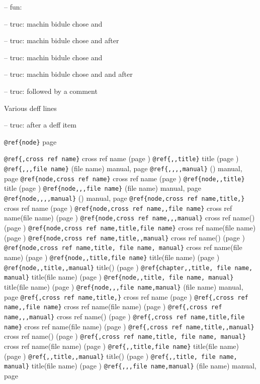 \documentclass{book}
\begin{document}
\hbox{}-- fun: 


\hbox{}-- truc: machin bidule chose and


\hbox{}-- truc: machin bidule chose and  after


\hbox{}-- truc: machin bidule chose and 


\hbox{}-- truc: machin bidule chose and and after


\hbox{}-- truc: followed by a comment


Various deff lines


\hbox{}-- truc: after a deff item


\texttt{@ref\{node\}} page \pageref{anchor:node}


\texttt{@ref\{,cross ref name\}} cross ref name (page \pageref{anchor:})
\texttt{@ref\{,,title\}} title (page \pageref{anchor:})
\texttt{@ref\{,,,file name\}} (file name) manual, page \pageref{anchor:}
\texttt{@ref\{,,,,manual\}} () manual, page \pageref{anchor:}
\texttt{@ref\{node,cross ref name\}} cross ref name (page \pageref{anchor:node})
\texttt{@ref\{node,,title\}} title (page \pageref{anchor:node})
\texttt{@ref\{node,,,file name\}} (file name) manual, page \pageref{anchor:node}
\texttt{@ref\{node,,,,manual\}} () manual, page \pageref{anchor:node}
\texttt{@ref\{node,cross ref name,title,\}} cross ref name (page \pageref{anchor:node})
\texttt{@ref\{node,cross ref name,,file name\}} cross ref name(file name) (page \pageref{anchor:node})
\texttt{@ref\{node,cross ref name,,,manual\}} cross ref name() (page \pageref{anchor:node})
\texttt{@ref\{node,cross ref name,title,file name\}} cross ref name(file name) (page \pageref{anchor:node})
\texttt{@ref\{node,cross ref name,title,,manual\}} cross ref name() (page \pageref{anchor:node})
\texttt{@ref\{node,cross ref name,title, file name, manual\}} cross ref name(file name) (page \pageref{anchor:node})
\texttt{@ref\{node,,title,file name\}} title(file name) (page \pageref{anchor:node})
\texttt{@ref\{node,,title,,manual\}} title() (page \pageref{anchor:node})
\texttt{@ref\{chapter,,title, file name, manual\}} title(file name) (page \pageref{anchor:chapter})
\texttt{@ref\{node,,title, file name, manual\}} title(file name) (page \pageref{anchor:node})
\texttt{@ref\{node,,,file name,manual\}} (file name) manual, page \pageref{anchor:node}
\texttt{@ref\{,cross ref name,title,\}} cross ref name (page \pageref{anchor:})
\texttt{@ref\{,cross ref name,,file name\}} cross ref name(file name) (page \pageref{anchor:})
\texttt{@ref\{,cross ref name,,,manual\}} cross ref name() (page \pageref{anchor:})
\texttt{@ref\{,cross ref name,title,file name\}} cross ref name(file name) (page \pageref{anchor:})
\texttt{@ref\{,cross ref name,title,,manual\}} cross ref name() (page \pageref{anchor:})
\texttt{@ref\{,cross ref name,title, file name, manual\}} cross ref name(file name) (page \pageref{anchor:})
\texttt{@ref\{,,title,file name\}} title(file name) (page \pageref{anchor:})
\texttt{@ref\{,,title,,manual\}} title() (page \pageref{anchor:})
\texttt{@ref\{,,title, file name, manual\}} title(file name) (page \pageref{anchor:})
\texttt{@ref\{,,,file name,manual\}} (file name) manual, page \pageref{anchor:}
\end{document}
